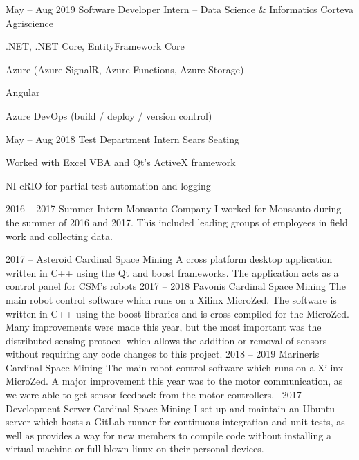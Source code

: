 \documentclass[9pt]{developercv} %
\begin{document}
\begin{entrylist}
	\entry
		{May -- Aug 2019}
		{Software Developer Intern -- Data Science \& Informatics}
		{Corteva Agriscience}
		{\begin{compactitem}
			\item .NET, .NET Core, EntityFramework Core
			\item Azure (Azure SignalR, Azure Functions, Azure Storage)
			\item Angular
			\item Azure DevOps (build / deploy / version control)
		\end{compactitem}}
	\entry
		{May -- Aug 2018}
		{Test Department Intern}
		{Sears Seating}
		{\begin{compactitem}
			\item Worked with Excel VBA and Qt's ActiveX framework
			\item NI cRIO for partial test automation and logging
		\end{compactitem}}
	\entry
		{2016 -- 2017}
		{Summer Intern}
		{Monsanto Company}
		{I worked for Monsanto during the summer of 2016 and 2017.  This included leading groups of employees in field work and collecting data.}
\end{entrylist}


\begin{entrylist}
	\entry
		{2017 --}
		{Asteroid}
		{Cardinal Space Mining}
		{A cross platform desktop application written in C++ using the Qt and boost frameworks.  The application acts as a control panel for CSM's robots}
	\entry
		{2017 -- 2018}
		{Pavonis}
		{Cardinal Space Mining}
		{The main robot control software which runs on a Xilinx MicroZed.  The software is written in C++ using the boost libraries and is cross compiled for the MicroZed.  Many improvements were made this year, but the most important was the distributed sensing protocol which allows the addition or removal of sensors without requiring any code changes to this project.}
	\entry
		{2018 -- 2019}
		{Marineris}
		{Cardinal Space Mining}
		{The main robot control software which runs on a Xilinx MicroZed.  A major improvement this year was to the motor communication, as we were able to get sensor feedback from the motor controllers.}\
	\entry
		{2017}
		{Development Server}
		{Cardinal Space Mining}
		{I set up and maintain an Ubuntu server which hosts a GitLab runner for continuous integration and unit tests, as well as provides a way for new members to compile code without installing a virtual machine or full blown linux on their personal devices.}
\end{entrylist}
\end{document}
